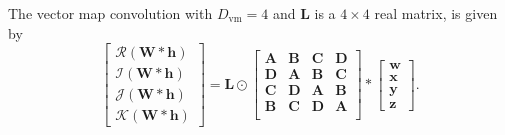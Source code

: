 \documentclass[14pt,a4paper]{article}
\begin{document}
The vector map convolution with $D_\mathrm{vm} = 4$ and $\textbf{L}$ is a $4\times4$ real matrix, is given by
\begin{equation}
\begin{bmatrix}
 \mathscr{R}(\textbf{W}\ast \textbf{h}) \\ 
 \mathscr{I}(\textbf{W}\ast \textbf{h}) \\
 \mathscr{J}(\textbf{W}\ast \textbf{h}) \\
 \mathscr{K}(\textbf{W}\ast \textbf{h}) 
\end{bmatrix}
=
\mathbf{L}\odot
\begin{bmatrix}
 \textbf{A} & \textbf{B} & \textbf{C} & \textbf{D} \\
 \textbf{D} & \textbf{A} & \textbf{B} & \textbf{C} \\
 \textbf{C} & \textbf{D} & \textbf{A} & \textbf{B} \\
 \textbf{B} & \textbf{C} & \textbf{D} & \textbf{A} \\
\end{bmatrix}
\ast
\begin{bmatrix}
 \textbf{w} \\ 
 \textbf{x} \\
 \textbf{y} \\
 \textbf{z}
\end{bmatrix} .
\label{e:vmapconv}
\end{equation}
\end{document}

